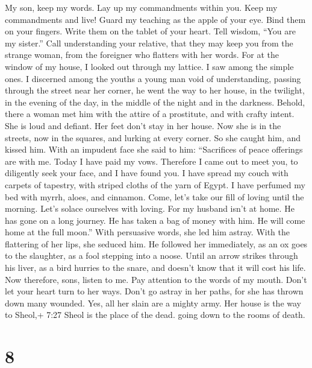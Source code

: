  My son, keep my words. Lay up my commandments within you.
 Keep my commandments and live! Guard my teaching as the
apple of your eye.  Bind them on your fingers. Write them on
the tablet of your heart.  Tell wisdom, ``You are my
sister.'' Call understanding your relative,  that they may
keep you from the strange woman, from the foreigner who flatters with
her words.  For at the window of my house, I looked out
through my lattice.  I saw among the simple ones. I
discerned among the youths a young man void of understanding,
 passing through the street near her corner, he went the way
to her house,  in the twilight, in the evening of the day,
in the middle of the night and in the darkness.  Behold,
there a woman met him with the attire of a prostitute, and with crafty
intent.  She is loud and defiant. Her feet don't stay in
her house.  Now she is in the streets, now in the squares,
and lurking at every corner.  So she caught him, and kissed
him. With an impudent face she said to him:  ``Sacrifices
of peace offerings are with me. Today I have paid my vows. 
Therefore I came out to meet you, to diligently seek your face, and I
have found you.  I have spread my couch with carpets of
tapestry, with striped cloths of the yarn of Egypt.  I have
perfumed my bed with myrrh, aloes, and cinnamon.  Come,
let's take our fill of loving until the morning. Let's solace ourselves
with loving.  For my husband isn't at home. He has gone on
a long journey.  He has taken a bag of money with him. He
will come home at the full moon.''  With persuasive words,
she led him astray. With the flattering of her lips, she seduced him.
 He followed her immediately, as an ox goes to the
slaughter, as a fool stepping into a noose.  Until an arrow
strikes through his liver, as a bird hurries to the snare, and doesn't
know that it will cost his life.  Now therefore, sons,
listen to me. Pay attention to the words of my mouth. 
Don't let your heart turn to her ways. Don't go astray in her paths,
 for she has thrown down many wounded. Yes, all her slain
are a mighty army.  Her house is the way to Sheol,+ 7:27
Sheol is the place of the dead. going down to the rooms of death.

\hypertarget{section-7}{%
\section{8}\label{section-7}}

